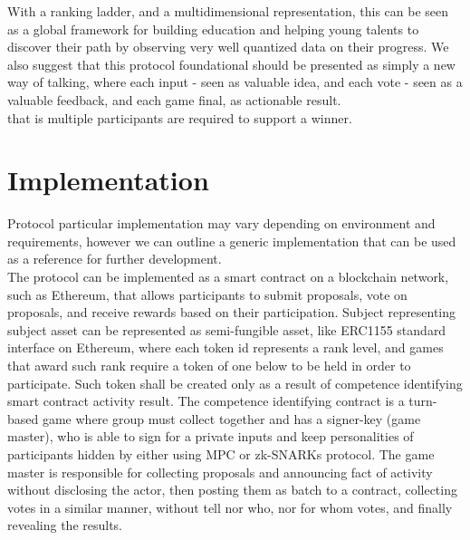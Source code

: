 \documentclass{article}
\begin{document}
\begin{CJK}{UTF8}{gbsn}
\begin{multicols}{2}
With a ranking ladder, and a multidimensional representation, this can be seen as a global framework for building education and helping young talents to discover their path by observing very well quantized data on their progress. We also suggest that this protocol foundational should be presented as simply a new way of talking, where each input - seen as valuable idea, and each vote - seen as a valuable feedback, and each game final, as actionable result.\\
that is multiple participants are required to support a winner.


\section{Implementation}
Protocol particular implementation may vary depending on environment and requirements, however we can outline a generic implementation that can be used as a reference for further development.\\
The protocol can be implemented as a smart contract on a blockchain network, such as Ethereum, that allows participants to submit proposals, vote on proposals, and receive rewards based on their participation. Subject representing subject asset can be represented as semi-fungible asset, like ERC1155\cite{EIP1155} standard interface on Ethereum, where each token id represents a rank level, and games that award such rank require a token of one below to be held in order to participate. Such token shall be created only as a result of competence identifying smart contract activity result. The competence identifying contract is a turn-based game where group must collect together and has a signer-key (game master), who is able to sign for a private inputs and keep personalities of participants hidden by either using MPC or zk-SNARKs protocol.
The game master is responsible for collecting proposals and announcing fact of activity without disclosing the actor, then posting them as batch to a contract, collecting votes in a similar manner, without tell nor who, nor for whom votes, and finally revealing the results.\\




\end{multicols}
\end{CJK}
\end{document}
